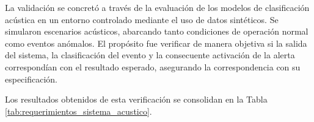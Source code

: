 La validación se concretó a través de la evaluación de los modelos de clasificación acústica en un entorno controlado mediante el uso de datos sintéticos. Se simularon escenarios acústicos, abarcando tanto condiciones de operación normal como eventos anómalos. El propósito fue verificar de manera objetiva si la salida del sistema, la clasificación del evento y la consecuente activación de la alerta correspondían con el resultado esperado, asegurando la correspondencia con su especificación.

Los resultados obtenidos de esta verificación se consolidan en la Tabla \ref{tab:requerimientos_sistema_acustico}.
